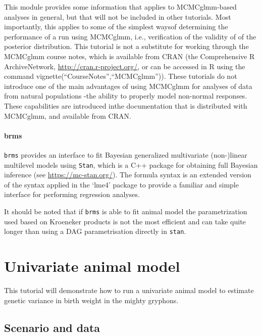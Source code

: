 \documentclass[12pt,]{book}
\begin{document}
This module provides some information that applies to MCMCglmm-based analyses in general, but that will not be included in other tutorials.
Most importantly, this applies to some of the simplest waysof determining the performance of a run using MCMCglmm, i.e., verification of the validity of of the posterior distribution.
This tutorial is not a substitute for working through the MCMCglmm course notes, which is available from CRAN (the Comprehensive R ArchiveNetwork, \url{http://cran.r-project.org/}, or can be accessed in R using the command vignette(``CourseNotes'',``MCMCglmm'')).
These tutorials do not introduce one of the main advantages of using MCMCglmm for analyses of data from natural populations -the ability to properly model non-normal responses.
These capabilities are introduced inthe documentation that is distributed with MCMCglmm, and available from CRAN.

\hypertarget{brms}{%
\subsubsection{brms}\label{brms}}

\texttt{brms} provides an interface to fit Bayesian generalized multivariate (non-)linear multilevel models using \texttt{Stan}, which is a C++ package for obtaining full Bayesian inference (see \url{https://mc-stan.org/}).
The formula syntax is an extended version of the syntax applied in the `lme4' package to provide a familiar and simple interface for performing regression analyses.

It should be noted that if \texttt{brms} is able to fit animal model the parametrization used based on Kroeneker products is not the most efficient and can take quite longer than using a DAG parametrisation directly in \texttt{stan}.

\hypertarget{univariate-animal-model}{%
\chapter{Univariate animal model}\label{univariate-animal-model}}

This tutorial will demonstrate how to run a univariate animal model to estimate genetic variance in birth weight in the mighty gryphons.

\hypertarget{scenario-and-data}{%
\section{Scenario and data}\label{scenario-and-data}}
\end{document}
